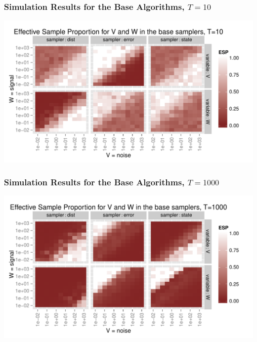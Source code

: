 \documentclass[xcolor=dvipsnames]{beamer}\usepackage{graphicx, color}
\newenvironment{knitrout}{}{} %
\begin{document}
\begin{frame}
  \frametitle{Simulation Results for the Base Algorithms, $T=10$}
  
\begin{knitrout}\footnotesize
{}\color{fgcolor}
\includegraphics[width=1\textwidth]{figure/baseESplotT10} 

\end{knitrout}

\end{frame}

\begin{frame}
    \frametitle{Simulation Results for the Base Algorithms, $T=1000$}
\begin{knitrout}\footnotesize
{}\color{fgcolor}
\includegraphics[width=1\textwidth]{figure/baseESplotT1000} 

\end{knitrout}


\end{frame}
\end{document}
